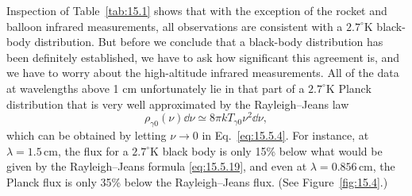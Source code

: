 Inspection of Table~\ref{tab:15.1} shows that with the exception of the rocket
and balloon infrared measurements, all observations are consistent with a
\(2.7^\circ\mathrm{K}\) black-body distribution. But before we conclude that
a black-body distribution has been definitely established, we have to ask how
significant this agreement is, and we have to worry about the high-altitude
infrared measurements. All of the data at wavelengths above 1 cm unfortunately
lie in that part of a \(2.7^\circ\mathrm{K}\) Planck distribution that is very
well approximated by the Rayleigh--Jeans law
\begin{equation}
  \rho_{\gamma0}(\nu)\dd\nu
  \simeq
  8\pi kT_{\gamma0}\nu^2\dd\nu,
  \tag{15.5.19}\label{eq:15.5.19}
\end{equation}
which can be obtained by letting \(\nu\to0\) in Eq.~\eqref{eq:15.5.4}. For
instance, at \(\lambda=1.5\,\mathrm{cm}\), the flux for a
\(2.7^\circ\mathrm{K}\) black body is only 15\% below what would be given by
the Rayleigh--Jeans formula \eqref{eq:15.5.19}, and even at
\(\lambda=0.856\,\mathrm{cm}\), the Planck flux is only 35\% below the
Rayleigh--Jeans flux. (See Figure~\ref{fig:15.4}.)



